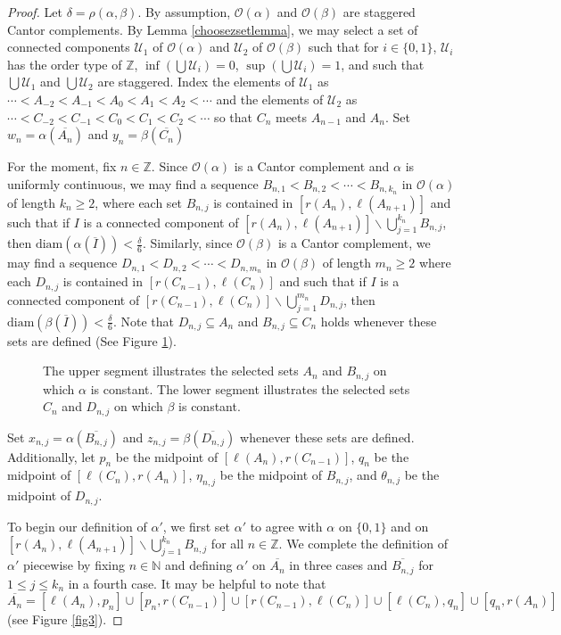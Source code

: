 \documentclass[10pt,a4paper]{amsart}
\newcommand{\bbn}{\mathbb{N}}
\newcommand{\bbz}{\mathbb{Z}}
\newcommand{\diam}{\text{diam}}
\newcommand{\mco}{\mathcal{O}}
\newcommand{\ov}{\overline}
\newcommand{\scru}{\mathscr{U}}
\begin{document}
\begin{proof}
Let $\delta=\rho(\alpha,\beta)$. By assumption, $\mco(\alpha)$ and $\mco(\beta)$ are staggered Cantor complements. By Lemma \ref{choosezsetlemma}, we may select a set of connected components $\scru_1$ of $\mco(\alpha)$ and $\scru_2$ of $\mco(\beta)$ such that for $i\in\{0,1\}$, $\scru_i$ has the order type of $\bbz$, $\inf(\bigcup\scru_i)=0$, $\sup(\bigcup\scru_i)=1$, and such that $\bigcup\scru_1$ and $\bigcup\scru_2$ are staggered. Index the elements of $\scru_1$ as $\cdots <A_{-2}<A_{-1}<A_0<A_1<A_2<\cdots$ and the elements of $\scru_2$ as $\cdots <C_{-2}<C_{-1}<C_0<C_1<C_2<\cdots$ so that $C_{n}$ meets $A_{n-1}$ and $A_n$. Set $w_n=\alpha(\ov{A_n})$ and $y_n=\beta(\ov{C_n})$

For the moment, fix $n\in\bbz$. Since $\mco(\alpha)$ is a Cantor complement and $\alpha$ is uniformly continuous, we may find a sequence $B_{n,1}<B_{n,2}<\cdots< B_{n,k_n}$ in $\mco(\alpha)$ of length $k_n\geq 2$, where each set $B_{n,j}$ is contained in $[r(A_n), \ell(A_{n+1})]$ and such that if $I$ is a connected component of $[r(A_n), \ell(A_{n+1})]\backslash \bigcup_{j=1}^{k_n}B_{n,j}$, then $\diam(\alpha(\ov{I}))<\frac{\delta}{6}$. Similarly, since $\mco(\beta)$ is a Cantor complement, we may find a sequence $D_{n,1}<D_{n,2}<\cdots< D_{n,m_n}$ in $\mco(\beta)$ of length $m_n\geq 2$ where each $D_{n,j}$ is contained in $[r(C_{n-1}), \ell(C_{n})]$ and such that if $I$ is a connected component of $[r(C_{n-1}), \ell(C_{n})]\backslash \bigcup_{j=1}^{m_n}D_{n,j}$, then $\diam(\beta(\ov{I}))<\frac{\delta}{6}$. Note that $D_{n,j}\subseteq A_n$ and $B_{n,j}\subseteq C_n$ holds whenever these sets are defined (See Figure \ref{fig2}).
\begin{figure}[H]
\centering 
\caption{\label{fig2} The upper segment illustrates the selected sets $A_n$ and $B_{n,j}$ on which $\alpha$ is constant. The lower segment illustrates the selected sets $C_n$ and $D_{n,j}$ on which $\beta$ is constant.}
\end{figure}
Set $x_{n,j}=\alpha(\ov{B_{n,j}})$ and $z_{n,j}=\beta(\ov{D_{n,j}})$ whenever these sets are defined. Additionally, let $p_n$ be the midpoint of $[\ell(A_n),r(C_{n-1})]$, $q_n$ be the midpoint of $[\ell(C_n),r(A_n)]$, $\eta_{n,j}$ be the midpoint of $B_{n,j}$, and $\theta_{n,j}$ be the midpoint of $D_{n,j}$.

To begin our definition of $\alpha'$, we first set $\alpha'$ to agree with $\alpha$ on $\{0,1\}$ and on $[r(A_n),\ell(A_{n+1})]\backslash \bigcup_{j=1}^{k_n}B_{n,j}$ for all $n\in\bbz$.
We complete the definition of $\alpha' $ piecewise by fixing $n\in\bbn$ and defining $\alpha'$ on $\ov{A_n}$ in three cases and $\ov{B_{n,j}}$ for $1\leq j\leq k_n$ in a fourth case. It may be helpful to note that
\[\ov{A_n}=[\ell(A_{n}),p_n]\cup [p_n,r(C_{n-1})]\cup [r(C_{n-1}),\ell(C_n)]\cup [\ell(C_n),q_n]\cup [q_n,r(A_n)]\]
(see Figure \ref{fig3}).


\end{proof}
\end{document}
